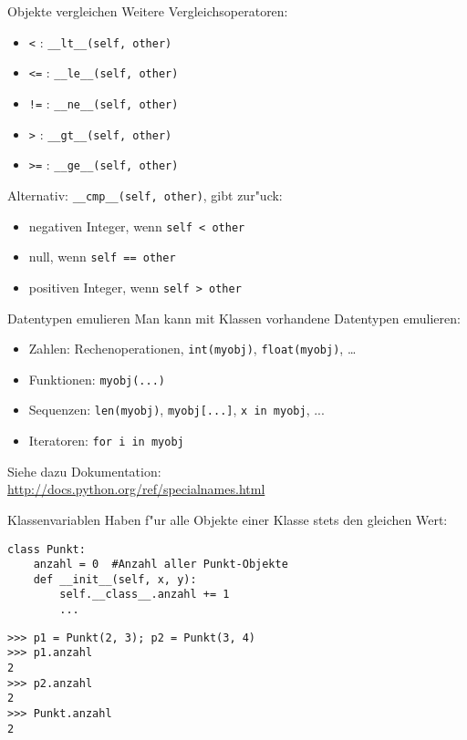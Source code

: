 \begin{frame}[fragile]{Objekte vergleichen}
Weitere Vergleichsoperatoren:
\begin{itemize}
\item \texttt{<} : \lstinline{__lt__(self, other)}
\item \texttt{<=} : \lstinline{__le__(self, other)}
\item \texttt{!=} : \lstinline{__ne__(self, other)}
\item \texttt{>} : \lstinline{__gt__(self, other)}
\item \texttt{>=} : \lstinline{__ge__(self, other)}
\end{itemize}
\vspace{2mm}
Alternativ: \lstinline{__cmp__(self, other)}, gibt zur"uck:
\begin{itemize}
\item negativen Integer, wenn \lstinline{self < other}
\item null, wenn \lstinline{self == other}
\item positiven Integer, wenn \lstinline{self > other}
\end{itemize}
\end{frame}

\begin{frame}{Datentypen emulieren}
Man kann mit Klassen vorhandene Datentypen emulieren:
\begin{itemize}
\item Zahlen: Rechenoperationen, \texttt{int(myobj)}, \texttt{float(myobj)}, \dots
\item Funktionen: \texttt{myobj(...)}
\item Sequenzen: \texttt{len(myobj)}, \texttt{myobj[...]}, \lstinline{x in myobj}, ...
\item Iteratoren: \lstinline{for i in myobj}
\end{itemize}
\vspace{2mm}
Siehe dazu Dokumentation:\\
\href{http://docs.python.org/ref/specialnames.html}{http://docs.python.org/ref/specialnames.html}
\end{frame}

\begin{frame}[fragile]{Klassenvariablen}
Haben f"ur alle Objekte einer Klasse stets den gleichen Wert:
\begin{lstlisting}[style=Python]
class Punkt:
    anzahl = 0  #Anzahl aller Punkt-Objekte
    def __init__(self, x, y):
        self.__class__.anzahl += 1
        ...
\end{lstlisting}
\begin{lstlisting}[style=Shell]
>>> p1 = Punkt(2, 3); p2 = Punkt(3, 4)
>>> p1.anzahl
2
>>> p2.anzahl
2
>>> Punkt.anzahl
2
\end{lstlisting}
\end{frame}

